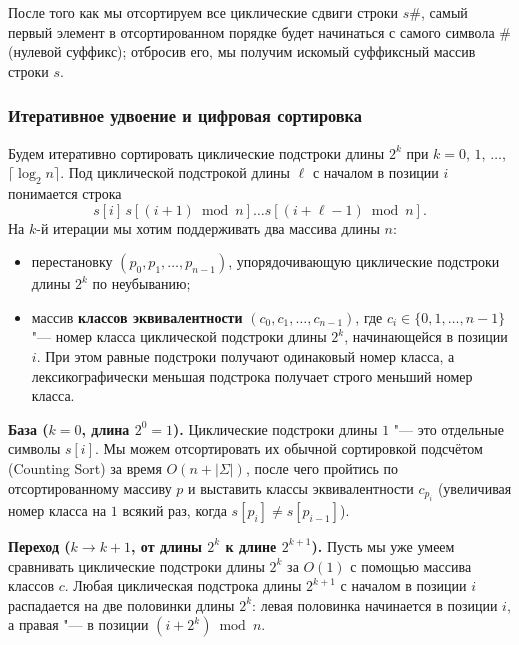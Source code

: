 После того как мы отсортируем все циклические сдвиги строки $s\mathtt{\#}$, самый первый элемент в отсортированном порядке будет начинаться с самого символа $\mathtt{\#}$ (нулевой суффикс); отбросив его, мы получим искомый суффиксный массив строки $s$.

\subsubsection{Итеративное удвоение и цифровая сортировка}

Будем итеративно сортировать циклические подстроки длины $2^k$ при $k = 0$, $1$, $\dots$, $\lceil \log_2 n \rceil$. Под циклической подстрокой длины $\ell$ с началом в позиции $i$ понимается строка
\[
    s[i] \, s[(i+1) \bmod n] \dots s[(i + \ell - 1) \bmod n].
\]
На $k$-й итерации мы хотим поддерживать два массива длины $n$:
\begin{itemize}
    \item перестановку $(p_0, p_1, \dots, p_{n-1})$, упорядочивающую циклические подстроки длины $2^k$ по неубыванию;
    \item массив \textbf{классов эквивалентности} $(c_0, c_1, \dots, c_{n-1})$, где $c_i \in \{0, 1, \dots, n-1\}$ "--- номер класса циклической подстроки длины $2^k$, начинающейся в позиции $i$. При этом равные подстроки получают одинаковый номер класса, а лексикографически меньшая подстрока получает строго меньший номер класса.
\end{itemize}

\textbf{База ($k = 0$, длина $2^0 = 1$).} Циклические подстроки длины $1$ "--- это отдельные символы $s[i]$. Мы можем отсортировать их обычной сортировкой подсчётом (Counting Sort) за время $O(n + |\Sigma|)$, после чего пройтись по отсортированному массиву $p$ и выставить классы эквивалентности $c_{p_i}$ (увеличивая номер класса на $1$ всякий раз, когда $s[p_i] \ne s[p_{i-1}]$).

\textbf{Переход ($k \to k + 1$, от длины $2^k$ к длине $2^{k+1}$).} Пусть мы уже умеем сравнивать циклические подстроки длины $2^k$ за $O(1)$ с помощью массива классов $c$. Любая циклическая подстрока длины $2^{k+1}$ с началом в позиции $i$ распадается на две половинки длины $2^k$: левая половинка начинается в позиции $i$, а правая "--- в позиции $(i + 2^k) \bmod n$.

\begin{center}
\end{center}

